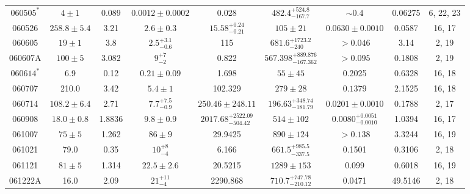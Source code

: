 \documentclass[a4paper,fleqn,usenatbib]{mnras}
\begin{document}
\begin{table*}
\begin{tabular}[width=1.0 \linewidth]{ccccccccc}
 $060505^{*}$&	$4\pm1$	&0.089 &	$0.0012\pm0.0002$ &	0.028&	$482.4_{-167.7}^{+524.8}$ &	$\sim0.4$&	0.06275 & 6, 22, 23\\		 																																																																																																																																					060526 &$258.8\pm5.4$ &	3.21 &	$2.6 \pm 0.3$ &	$15.58_{-0.21}^{+0.24}$ &	$105 \pm 21$ &	$0.0630\pm0.0010$ &	0.0587 &	16, 17 \\																																																																					060605 &	$19 \pm 1$ &	3.8 &	$2.5_{-0.6}^{+3.1}$ &	115 &	$681.6_{-240}^{+1723.2}$ &	$>0.046$ &	3.14 &	2, 19 \\																																																																					060607A &	$100 \pm 5$ &	3.082 &	$9_{-2}^{+7}$ &	0.822 &	$567.398_{-167.362}^{+889.876}$ &	$>0.095$ &	0.1808 &	2, 19 \\																																																																					$060614^{*}$ &	6.9 &	0.12 &	$0.21 \pm 0.09$ &	1.698 &	$55 \pm 45$ &	0.2025 &	0.6328 &	16, 18 \\																																																																					060707 &	210.0 &	3.42 &	$5.4 \pm 1$ &	   102.329 &	$279 \pm 28$ &	$0.1379$ &	2.1525 &	16, 18 \\																																																																					060714 &	$108.2\pm6.4$ &	2.71 &	$7.7_{-0.9}^{+7.5}$ &	$250.46 \pm 248.11$ &	$196.63_{-181.79}^{+348.74}$ &	$0.0201\pm0.0010$ &	0.1788 &	2, 17 \\																																																																					060908 &	$18.0\pm0.8$ &	1.8836 &	$9.8 \pm 0.9$ &	$2017.68_{-504.42}^{+2522.09}$ &	$514 \pm 102$ &	$0.0080_{-0.0010}^{+0.0051}$ &	1.0394 & 16, 17 \\																																																																					061007 &	$75\pm5$ &	1.262 &	$86 \pm 9$ &	29.9425 &	$890 \pm 124$ &	$>0.138$ &	3.3244 &	16, 19 \\																																																																					061021 &	79.0 &	0.35 &	$10_{-4}^{+8}$ &	    6.166 &	$661.5_{-337.5}^{+985.5}$ &	0.1501 &	0.3106 &	2, 18 \\																																																																					061121 &	$81\pm 5$ &	1.314 &	$22.5 \pm 2.6$ &	20.5215 &	$1289 \pm 153$ &	0.099 &	0.6018 &	16, 19 \\																																																																					061222A &	16.0 &	2.09 &	$21_{-4}^{+11}$ &	2290.868 &	$710.7_{-210.12}^{+747.78}$ &	0.0471 &	49.5146 &	2, 18 \\

\end{tabular}
\end{table*}
\end{document}
